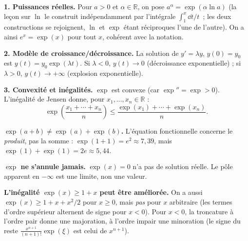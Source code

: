 \begin{mdframed}[style=exbar]
  \textbf{1. Puissances réelles.}\enspace%
  Pour $a > 0$ et $\alpha \in \mathbb{R}$, on pose $a^\alpha = \exp(\alpha\ln a)$
  (la leçon sur $\ln$ le construit indépendamment par l'intégrale
  $\int_1^x \dd t/t$~; les deux constructions se rejoignent, $\ln$ et
  $\exp$ étant réciproques l'une de l'autre).
  On a ainsi $e^x = \exp(x)$ pour tout $x$, cohérent avec la notation.

  \smallskip\noindent
  \textbf{2. Modèle de croissance/décroissance.}\enspace%
  La solution de $y' = \lambda y$, $y(0) = y_0$ est $y(t) = y_0 \exp(\lambda t)$.
  Si $\lambda < 0$, $y(t)\to 0$ (décroissance exponentielle) ;
  si $\lambda > 0$, $y(t)\to +\infty$ (explosion exponentielle).

  \smallskip\noindent
  \textbf{3. Convexité et inégalités.}\enspace%
  $\exp$ est convexe (car $\exp'' = \exp > 0$). L'inégalité de Jensen donne,
  pour $x_1, \ldots, x_n \in \mathbb{R}$ :
  \[
    \exp\!\left(\frac{x_1+\cdots+x_n}{n}\right) \leq
    \frac{\exp(x_1)+\cdots+\exp(x_n)}{n}.
  \]
\end{mdframed}

\vspace{6pt}

\begin{mdframed}[style=cexbar]
  \textbf{$\exp(a+b) \neq \exp(a)+\exp(b)$.}\enspace%
  L'équation fonctionnelle concerne le \emph{produit}, pas la somme :
  $\exp(1+1) = e^2 \approx 7{,}39$, mais $\exp(1)+\exp(1) = 2e \approx 5{,}44$.

  \smallskip\noindent
  \textbf{$\exp$ ne s'annule jamais.}\enspace%
  $\exp(x) = 0$ n'a pas de solution réelle. Le pôle apparent en $-\infty$
  est une limite, non une valeur.

  \smallskip\noindent
  \textbf{L'inégalité $\exp(x)\geq 1+x$ peut être améliorée.}\enspace%
  On a aussi $\exp(x) \geq 1+x+x^2/2$ pour $x \geq 0$, mais
  \emph{pas} pour $x$ arbitraire (les termes d'ordre supérieur alternent
  de signe pour $x < 0$). Pour $x < 0$, la troncature à l'ordre pair
  donne une majoration, à l'ordre impair une minoration (le signe du reste
  $\frac{x^{n+1}}{(n+1)!}\exp(\xi)$ est celui de $x^{n+1}$).
\end{mdframed}

\vspace{6pt}
\exolabel

